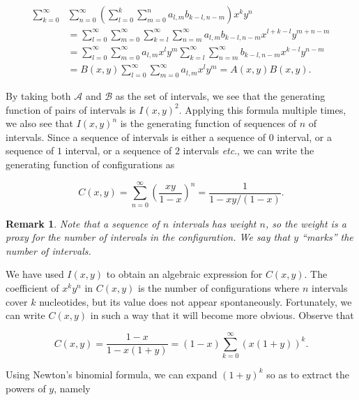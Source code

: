 \documentclass{article}
\newtheorem{remark}{Remark}
\begin{document}
\begin{equation*}
\begin{split}
\sum_{k=0}^\infty &\sum_{n=0}^\infty \left( \sum_{l=0}^k \sum_{m=0}^n
  a_{l,m}b_{k-l,n-m}\right) x^k y^n \\
&= \sum_{l=0}^\infty \sum_{m=0}^\infty \sum_{k=l}^\infty \sum_{n=m}^\infty
  a_{l,m}b_{k-l,n-m}x^{l + k-l} y^{m + n-m} \\ 
&= \sum_{l=0}^\infty \sum_{m=0}^\infty a_{l,m} x^l y^m
  \sum_{k=l}^\infty \sum_{n=m}^\infty
  b_{k-l,n-m}x^{k-l} y^{n-m} \\
&= B(x,y) \sum_{l=0}^\infty \sum_{m=0}^\infty a_{l,m} x^l y^m
 = A(x,y)B(x,y).
\end{split}
\end{equation*}

By taking both $\mathcal{A}$ and $\mathcal{B}$ as the set of intervals, we
see that the generating function of pairs of intervals is $I(x,y)^2$.
Applying this formula multiple times, we also see that $I(x,y)^n$ is the
generating function of sequences of $n$ of intervals. Since a sequence of
intervals is either a sequence of $0$ interval, or a sequence of $1$
interval, or a sequence of $2$ intervals \textit{etc}., we can write the
generating function of configurations as

\begin{equation*}
C(x,y) = \sum_{n=0}^\infty \left( \frac{xy}{1-x} \right)^n
= \frac{1}{1 - xy/(1-x)}.
\end{equation*}

\begin{remark}
Note that a sequence of $n$ intervals has weight $n$, so the weight is a
proxy for the number of intervals in the configuration.  We say that $y$
``marks'' the number of intervals.
\end{remark}

We have used $I(x,y)$ to obtain an algebraic expression for $C(x,y)$. The
coefficient of $x^ky^n$ in $C(x,y)$ is the number of configurations where
$n$ intervals cover $k$ nucleotides, but its value does not appear
spontaneously. Fortunately, we can write $C(x,y)$ in such a way that it
will become more obvious. Observe that

\begin{equation}
\label{eq:C}
C(x,y) = \frac{1-x}{1-x(1+y)} =
(1-x) \sum_{k=0}^\infty \left(x(1+y) \right)^k.
\end{equation}


Using Newton's binomial formula, we can expand $(1+y)^k$ so as to extract
the powers of $y$, namely
\end{document}
